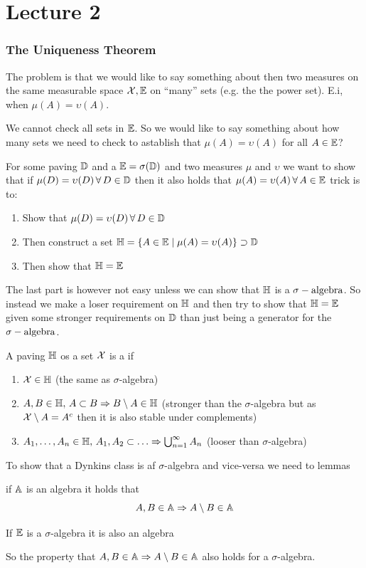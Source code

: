 \section{Lecture 2} %
\label{sec:lecture_2}

\subsubsection*{The Uniqueness Theorem} %
\label{ssub:the_uniqueness_theorem}
The problem is that we would like to say something about then two measures on the same measurable space \({\mathcal{X}},{\mathbb{E}}\) on ``many'' sets (e.g. the the power set). E.i, when \(\mu(A)=\upsilon(A)\).

We cannot check all sets in \({\mathbb{E}}\). So we would like to say something about how many sets we need to check to astablish that \(\mu(A)=\upsilon(A)\) for all \(A\in{\mathbb{E}}\)?

For some paving \({\mathbb{D}}\) and a \({\mathbb{E}}=\sigma({\mathbb{D}})\) and two measures \(\mu\) and \(\upsilon\) we want to show that if \(\mu(D)=\upsilon(D)\, \forall \, D\in {\mathbb{D}}\) then it also holds that \(\mu(A)=\upsilon(A)\, \forall \, A\in {\mathbb{E}}\) trick is to:
\begin{enumerate}
  \item Show that \(\mu(D)=\upsilon(D)\, \forall \, D\in{\mathbb{D}}\)
  \item Then construct a set \({\mathbb{H}}=\{A\in{\mathbb{E}}\mid \mu(A)=\upsilon(A)\}\supset{\mathbb{D}}\)
  \item Then show that \({\mathbb{H}}={\mathbb{E}}\)
\end{enumerate}

The last part is however not easy unless we can show that \({\mathbb{H}}\) is a \(\sigma-\text{algebra}\). So instead we make a loser requirement on \({\mathbb{H}}\) and then try to show that \({\mathbb{H}}={\mathbb{E}}\) given some stronger requirements on \({\mathbb{D}}\) than just being a generator for the \(\sigma-\text{algebra}\).
\begin{defn}
A paving \({\mathbb{H}}\) os a set \({\mathcal{X}}\) is a  if
\begin{enumerate}
  \item \({\mathcal{X}}\in{\mathbb{H}}\) (the same as \(\sigma\)-algebra)
  \item \(A,B\in{\mathbb{H}},\, A\subset B \Rightarrow B\setminus A\in {\mathbb{H}}\) (stronger than the \(\sigma\)-algebra but as \({\mathcal{X}}\setminus A=A^c\) then it is also stable under complements)
  \item \(A_1,\ldots,A_n\in{\mathbb{H}},\, A_1, A_2 \subset \ldots \Rightarrow \bigcup_{n=1}^\infty A_n\) (looser than \(\sigma\)-algebra)
\end{enumerate}
\end{defn}
To show that a Dynkins class is af \(\sigma\)-algebra and vice-versa we need to lemmas
\begin{lem}
if \({\mathbb{A}}\) is an algebra it holds that
\[
  A,B\in{\mathbb{A}} \Rightarrow A\setminus B\in {\mathbb{A}}
\]
\end{lem}
\begin{lem}
If \({\mathbb{E}}\) is a \(\sigma\)-algebra it is also an algebra
\end{lem}
So the property that \(A,B\in{\mathbb{A}} \Rightarrow A\setminus B\in {\mathbb{A}} \) also holds for a \(\sigma\)-algebra.

